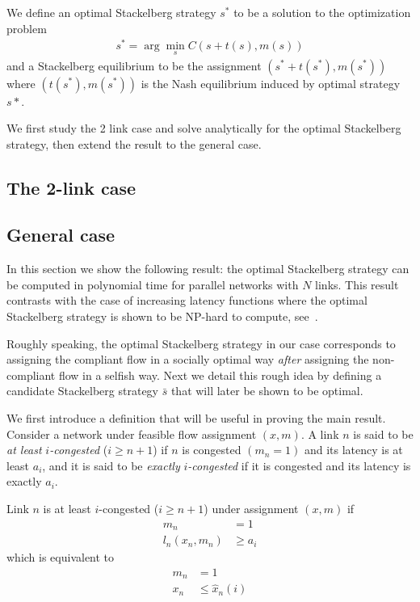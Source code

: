 We define an optimal Stackelberg strategy $s^*$ to be a solution to the optimization problem
\begin{align*}
s^* = \arg \min_s C\left( s + t(s), m(s) \right)
\end{align*}
and a Stackelberg equilibrium to be the assignment $(s^* + t(s^*), m(s^*))$ where $(t(s^*), m(s^*))$ is the Nash equilibrium induced by optimal strategy $s*$.


\bigskip
We first study the 2 link case and solve analytically for the optimal Stackelberg strategy, then extend the result to the general case.

\subsection{The 2-link case}


\subsection{General case}
In this section we show the following result: the optimal Stackelberg strategy can be computed in polynomial time for parallel networks with $N$ links. This result contrasts with the case of increasing latency functions where the optimal Stackelberg strategy is shown to be NP-hard to compute, see~\cite{rou01}.

\bigskip
Roughly speaking, the optimal Stackelberg strategy in our case corresponds to assigning the compliant flow in a socially optimal way \emph{after} assigning the non-compliant flow in a selfish way. Next we detail this rough idea by defining a candidate Stackelberg strategy $\bar{s}$ that will later be shown to be optimal.

We first introduce a definition that will be useful in proving the main result. Consider a network under feasible flow assignment $(x, m)$. A link $n$ is said to be \emph{at least} $i$\emph{-congested} ($i \geq n+1$) if $n$ is congested $(m_n = 1)$ and its latency is at least $a_i$, and it is said to be \emph{exactly} $i$\emph{-congested} if it is congested and its latency is exactly $a_i$.

\begin{definition}
Link $n$ is at least $i$-congested ($i \geq n+1$) under assignment $(x, m)$ if
\begin{align*}
m_n &= 1 \\
l_n(x_n, m_n) &\geq a_i
\end{align*}
which is equivalent to 
\begin{align*}
m_n &= 1 \\
x_n &\leq \hat{x}_n(i)
\end{align*}
\end{definition}

